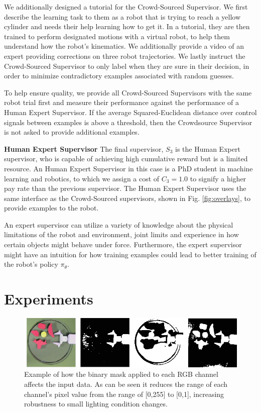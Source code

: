 \documentclass[10pt, conference]{ieeeconf}      %
\begin{document}
We additionally designed a tutorial for the Crowd-Sourced Supervisor. We first describe the learning task to them as a
robot that is trying to reach a yellow cylinder and needs their help learning how to get it. In a tutorial, they are then trained
to perform designated motions with a virtual robot, to help them understand how the robot's kinematics. We additionally
provide a video of an expert providing corrections on three robot trajectories. We lastly instruct the Crowd-Sourced
Supervisor to only label when they are sure in their decision, in order to minimize contradictory examples associated
with random guesses.  

To help ensure quality, we provide all Crowd-Sourced Supervisors with the same robot trial first and measure their
performance against the performance of a Human Expert Supervisor. If the average Squared-Euclidean distance over control
signals between examples is above a threshold, then the Crowdsource Supervisor is not asked to provide additional examples.

\noindent \textbf{Human Expert Supervisor} The final supervisor, $S_3$ is the Human Expert supervisor, who is capable of
achieving high cumulative reward but is a limited resource. An Human Expert Supervisor in this case is a PhD student in
machine learning and robotics, to which we assign a cost of $C_3=1.0$ to signify a higher pay rate than the previous supervisor. The Human Expert Supervisor uses the same
interface as the Crowd-Sourced supervisors, shown in Fig. \ref{fig:overlays}, to provide examples to the robot.  

An expert supervisor can utilize a variety of knowledge about the physical limitations of the robot and environment,
joint limits and experience in how certain objects might behave under force. Furthermore, the expert supervisor might
have an intuition for how training examples could lead to better training of the robot's policy $\pi_\theta$. 


\section{Experiments} \label{sec:Exp}

\begin{figure}[t]
\centering

\includegraphics{f_figs/binary_segment.eps}

\caption{\footnotesize Example of how the binary mask applied to each RGB channel affects the input data. As can be seen
it reduces the range of each channel's pixel value from the range of [0,255] to [0,1], increasing robustness to small
lighting condition changes.  }

\label{fig:b_seg}
\end{figure}
\end{document}
